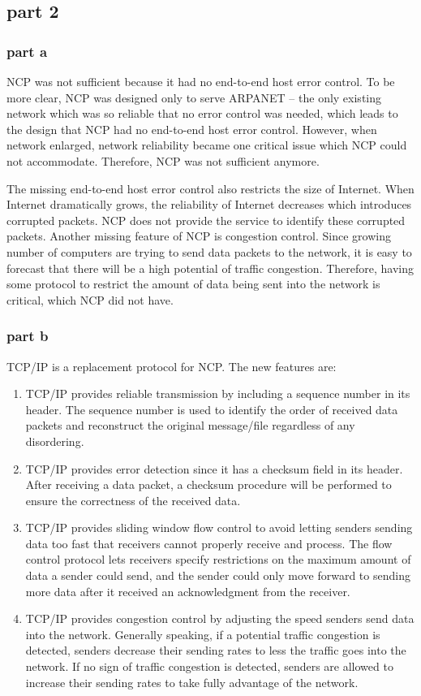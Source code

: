 \subsection{part 2}
\subsubsection{part a} NCP was not sufficient because it had no end-to-end host error control. To be more clear, NCP was designed only to serve ARPANET -- the only existing network which was so reliable that no error control was needed, which leads to the design that NCP had no end-to-end host error control. However, when network enlarged, network reliability became one critical issue which NCP could not accommodate. Therefore, NCP was not sufficient anymore.

The missing end-to-end host error control also restricts the size of Internet. When Internet dramatically grows, the reliability of Internet decreases which introduces corrupted packets. NCP does not provide the service to identify these corrupted packets. Another missing feature of NCP is congestion control. Since growing number of computers are trying to send data packets to the network, it is easy to forecast that there will be a high potential of traffic congestion. Therefore, having some protocol to restrict the amount of data being sent into the network is critical, which NCP did not have.
\subsubsection{part b} TCP/IP is a replacement protocol for NCP. The new features are:

\begin{enumerate}
\item TCP/IP provides reliable transmission by including a sequence number in its header. The sequence number is used to identify the order of received data packets and reconstruct the original message/file regardless of any disordering.
\item TCP/IP provides error detection since it has a checksum field in its header. After receiving a data packet, a checksum procedure will be performed to ensure the correctness of the received data.
\item TCP/IP provides sliding window flow control to avoid letting senders sending data too fast that receivers cannot properly receive and process. The flow control protocol lets receivers specify restrictions on the maximum amount of data a sender could send, and the sender could only move forward to sending more data after it received an acknowledgment from the receiver.
\item TCP/IP provides congestion control by adjusting the speed senders send data into the network. Generally speaking, if a potential traffic congestion is detected, senders decrease their sending rates to less the traffic goes into the network. If no sign of traffic congestion is detected, senders are allowed to increase their sending rates to take fully advantage of the network.
\end{enumerate}

